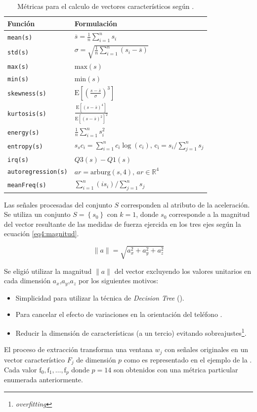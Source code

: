 \begin{table}[!tbph]
\begin{centering}
\begin{tabular}{|l|l|}
\hline 
Función & Formulación\tabularnewline
\hline 
\hline 
\texttt{mean(s)} & $\overline{s}=\frac{1}{n}\sum_{i=1}^{n}s_{i}$\tabularnewline
\hline 
\texttt{std(s)} & $\sigma=\sqrt{\frac{1}{n}\sum_{i=1}^{n}\left(s_{i}-\overline{s}\right)}$\tabularnewline
\hline 
\texttt{max(s)} & $\mathrm{max}(s)$\tabularnewline
\hline 
\texttt{min(s)} & $\mathrm{min}(s)$\tabularnewline
\hline 
\texttt{skewness(s)} & $\mathrm{E}\left[\left(\frac{s-\overline{s}}{\sigma}\right)^{3}\right]$\tabularnewline
\hline 
\texttt{kurtosis(s)} & $\frac{\mathrm{E}\left[\left(s-\overline{s}\right)^{4}\right]}{\mathrm{E}\left[\left(s-\overline{s}\right)^{2}\right]^{2}}$\tabularnewline
\hline 
\texttt{energy(s)} & $\frac{1}{n}\sum_{i=1}^{n}s_{i}^{2}$\tabularnewline
\hline 
\texttt{entropy(s)} & $s_{s}c_{i}=\sum_{i=1}^{n}c_{i}\log\left(c_{i}\right)\mathrm{\mathtt{\mathrm{,}}\,c_{i}}=s_{i}/\sum_{j=1}^{n}s_{j}$\tabularnewline
\hline 
\texttt{irq(s)} & $Q3(s)-Q1(s)$\tabularnewline
\hline 
\texttt{autoregression(s)} & $ar=\mathrm{arburg}\left(s,4\right)\mathrm{,}\,ar\in\mathbb{R}^{4}$\tabularnewline
\hline 
\texttt{meanFreq(s)} & $\sum_{i=1}^{n}\left(is_{i}\right)/\sum_{j=1}^{n}s_{j}$\tabularnewline
\hline 
\end{tabular}
\par\end{centering}
\caption[Métricas de valores característicos]{\label{tab4:metricas}Métricas para el calculo de vectores característicos
según \cite{ReyesOrtiz2015}.}
\end{table}

Las señales procesadas del conjunto $S$ corresponden al atributo
de la aceleración. Se utiliza un conjunto $S=\left\{ s_{0}\right\} $
con $k=1$, donde $s_{0}$ corresponde a la magnitud del vector resultante
de las medidas de fuerza ejercida en los tres ejes según la ecuación
\ref{eq4:magnitud}.

\begin{equation}
\lVert a\rVert=\sqrt{a_{x}^{2}+a_{y}^{2}+a_{z}^{2}}\label{eq4:magnitud}
\end{equation}

Se eligió utilizar la magnitud $\lVert a\rVert$ del vector excluyendo
los valores unitarios en cada dimensión $a_{x}$,$a_{y}$,$a_{z}$
por los siguientes motivos:
\begin{itemize}
\item Simplicidad para utilizar la técnica de \emph{Decision Tree} ().
\item Para cancelar el efecto de variaciones en la orientación del teléfono
\cite{Schneider2014}.
\item Reducir la dimensión de características (a un tercio) evitando sobreajustes\footnote{\emph{overfitting}}.
\end{itemize}
El proceso de extracción transforma una ventana $w_{j}$ con señales
originales en un vector característico $F_{j}$ de dimensión $p$
como es representado en el ejemplo de la .
Cada valor $\mathrm{f}_{0},\mathrm{f}_{1},\ldots,\mathrm{f}_{p}$
donde $p=14$ son obtenidos con una métrica particular enumerada anteriormente.

